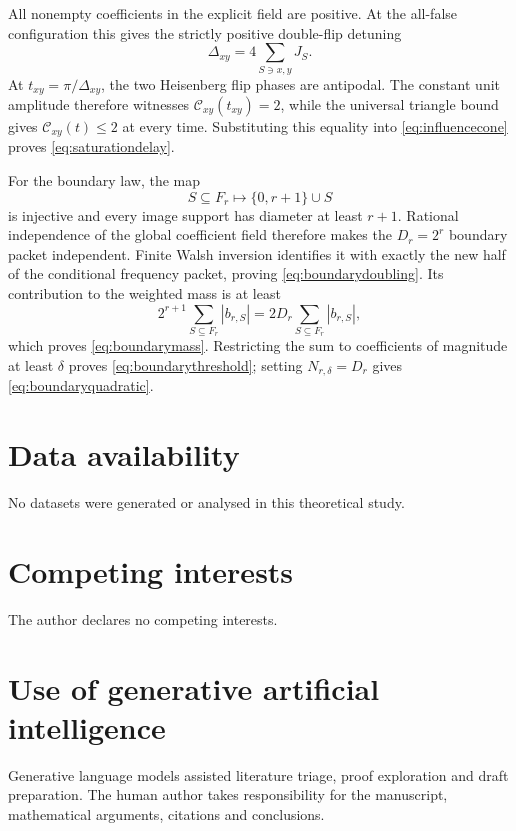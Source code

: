 \documentclass[10pt]{article}
\theoremstyle{definition}
\begin{document}
All nonempty coefficients in the explicit field are positive. At the
all-false configuration this gives the strictly positive double-flip
detuning
\[
 \Delta_{xy}=4\sum_{S\ni x,y}J_S.
\]
At \(t_{xy}=\pi/\Delta_{xy}\), the two Heisenberg flip phases are antipodal.
The constant unit amplitude therefore witnesses
\(\mathcal C_{xy}(t_{xy})=2\), while the universal triangle bound gives
\(\mathcal C_{xy}(t)\le2\) at every time. Substituting this equality into
\eqref{eq:influencecone} proves \eqref{eq:saturationdelay}.

For the boundary law, the map
\[
 S\subseteq F_r\longmapsto \{0,r+1\}\cup S
\]
is injective and every image support has diameter at least \(r+1\).
Rational independence of the global coefficient field therefore makes the
\(D_r=2^r\) boundary packet independent. Finite Walsh inversion identifies
it with exactly the new half of the conditional frequency packet, proving
\eqref{eq:boundarydoubling}. Its contribution to the weighted mass is at
least
\[
 2^{r+1}\sum_{S\subseteq F_r}|b_{r,S}|
 =2D_r\sum_{S\subseteq F_r}|b_{r,S}|,
\]
which proves \eqref{eq:boundarymass}. Restricting the sum to coefficients
of magnitude at least \(\delta\) proves
\eqref{eq:boundarythreshold}; setting \(N_{r,\delta}=D_r\) gives
\eqref{eq:boundaryquadratic}.

\section*{Data availability}

No datasets were generated or analysed in this theoretical study.

\section*{Competing interests}

The author declares no competing interests.

\section*{Use of generative artificial intelligence}

Generative language models assisted literature triage, proof exploration
and draft preparation. The human author takes responsibility for the
manuscript, mathematical arguments, citations and conclusions.
\end{document}
